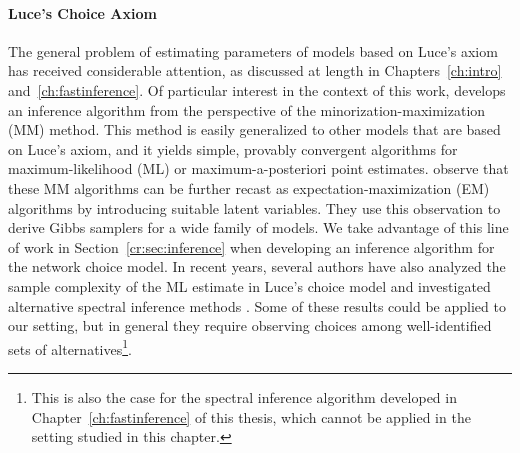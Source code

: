 \paragraph{Luce's Choice Axiom}
The general problem of estimating parameters of models based on Luce's axiom has received considerable attention, as discussed at length in Chapters~\ref{ch:intro} and~\ref{ch:fastinference}.
Of particular interest in the context of this work, \citet{hunter2004mm} develops an inference algorithm from the perspective of the minorization-maximization (MM) method.
This method is easily generalized to other models that are based on Luce's axiom, and it yields simple, provably convergent algorithms for maximum-likelihood (ML) or maximum-a-posteriori point estimates.
\citet{caron2012efficient} observe that these MM algorithms can be further recast as expectation-maximization (EM) algorithms by introducing suitable latent variables.
They use this observation to derive Gibbs samplers for a wide family of models.
We take advantage of this line of work in Section~\ref{cr:sec:inference} when developing an inference algorithm for the network choice model.
In recent years, several authors have also analyzed the sample complexity of the ML estimate in Luce's choice model \citep{hajek2014minimax, vojnovic2016parameter} and investigated alternative spectral inference methods \citep{negahban2012iterative, azari2013generalized}.
Some of these results could be applied to our setting, but in general they require observing choices among well-identified sets of alternatives\footnote{%
This is also the case for the spectral inference algorithm developed in Chapter~\ref{ch:fastinference} of this thesis, which cannot be applied in the setting studied in this chapter.
}.


